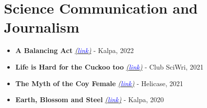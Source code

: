 \section{Science Communication and Journalism}

\begin{itemize}

    \item \textbf{A Balancing Act }{\href{https://kalpa.iiserpune.ac.in/a-balancing-act/}{\textit{(\textcolor{blue}{link})}}} - Kalpa, 2022 

    \item \textbf{Life is Hard for the Cuckoo too }{\href{https://sciwri.club/archives/12003}{\textit{(\textcolor{blue}{link})}}} - Club SciWri, 2021
    
    \item \textbf{The Myth of the Coy Female }{\href{https://drive.google.com/file/d/1XRSBnw8T-pQ02dZYOCsBARAn1Hb9HZ4B/view?usp=sharing}{\textit{(\textcolor{blue}{link})}}} - Helicase, 2021

    \item \textbf{Earth, Blossom and Steel }{\href{https://kalpa.iiserpune.ac.in/earth-blossom-and-steel/}{\textit{(\textcolor{blue}{link})}}} - Kalpa, 2020
  
\end{itemize}




	


